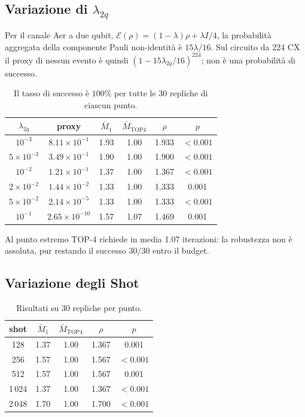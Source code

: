 \begin{onehalfspace}
\subsection{Variazione di $\lambda_{2q}$}
\label{subsec:sweep_eps}

Per il canale Aer a due qubit,
$\mathcal E(\rho)=(1-\lambda)\rho+\lambda I/4$, la probabilità
aggregata della componente Pauli non-identità è $15\lambda/16$. Sul
circuito da 224 CX il proxy di nessun evento è quindi
$(1-15\lambda_{2q}/16)^{224}$; non è una probabilità di successo.

\begin{table}[H]
\centering
\caption[Sweep del parametro Aer $\lambda_{2q}$]{Il tasso di successo è
$100\%$ per tutte le 30 repliche di ciascun punto.}
\label{tab:sweep_eps}
\label{tab:sweep_eps2q}
\begin{tabular}{cccccc}
\toprule
$\lambda_{2q}$ & proxy & $\bar M_1$ & $\bar M_{\mathrm{TOP4}}$ & $\rho$ & $p$ \\
\midrule
$10^{-3}$ & $8.11\times10^{-1}$ & 1.93 & 1.00 & 1.933 & $<0.001$ \\
$5\times10^{-3}$ & $3.49\times10^{-1}$ & 1.90 & 1.00 & 1.900 & $<0.001$ \\
$10^{-2}$ & $1.21\times10^{-1}$ & 1.37 & 1.00 & 1.367 & $<0.001$ \\
$2\times10^{-2}$ & $1.44\times10^{-2}$ & 1.33 & 1.00 & 1.333 & 0.001 \\
$5\times10^{-2}$ & $2.14\times10^{-5}$ & 1.33 & 1.00 & 1.333 & $<0.001$ \\
$10^{-1}$ & $2.65\times10^{-10}$ & 1.57 & 1.07 & 1.469 & 0.001 \\
\bottomrule
\end{tabular}
\end{table}

Al punto estremo TOP-4 richiede in media 1.07 iterazioni: la robustezza
non è assoluta, pur restando il successo $30/30$ entro il budget.

\subsection{Variazione degli Shot}
\label{subsec:sweep_shots}

\begin{table}[H]
\centering
\caption[Sweep degli shot]{Risultati su 30 repliche per punto.}
\label{tab:sweep_shots}
\begin{tabular}{ccccc}
\toprule
shot & $\bar M_1$ & $\bar M_{\mathrm{TOP4}}$ & $\rho$ & $p$ \\
\midrule
128  & 1.37 & 1.00 & 1.367 & 0.001 \\
256  & 1.57 & 1.00 & 1.567 & $<0.001$ \\
512  & 1.57 & 1.00 & 1.567 & 0.001 \\
1\,024 & 1.37 & 1.00 & 1.367 & $<0.001$ \\
2\,048 & 1.70 & 1.00 & 1.700 & $<0.001$ \\
\bottomrule
\end{tabular}
\end{table}


\end{onehalfspace}
